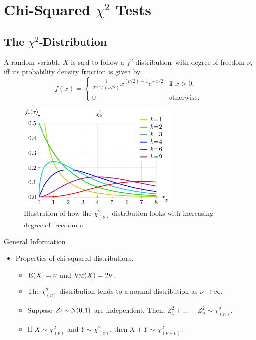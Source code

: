 \documentclass[../Notes.tex]{subfiles}
\begin{document}
\chapter{Chi-Squared \(\chi^2\) Tests}
\section{The \(\chi^2\)-Distribution}
\begin{definition}{}{}
  A random variable \(X\) is said to follow a \(\chi^2\)-distribution, with degree of freedom \(\nu\), iff its probability density function is given by
  \[f(x)=\begin{cases}
    \frac{1}{2^{\nu/2}\Gamma(\nu/2)}x^{(\nu/2)-1}e^{-x/2} &\text{if \(x>0\)},\\
    0 &\text{otherwise}.
  \end{cases}\]
\end{definition}
\begin{figure}[H]
  \centering
  \includegraphics[width=0.7\textwidth]{../Diagrams/Chi-square.pdf}
  \caption{Illustration of how the \(\chi_{(\nu)}^2\) distribution looks with increasing degree of freedom \(\nu\).}
  \label{fig:chi-square}
\end{figure}
\begin{stbox}{General Information}
  \begin{itemize}
    \item Properties of chi-squared distributions.
    \begin{itemize}
      \item \(\operatorname{E}(X)=\nu\) and \(\operatorname{Var}(X)=2\nu\).
      \item The \(\chi_{(\nu)}^2\) distribution tends to a normal distribution as \(\nu\to\infty\).
      \item Suppose \(Z_i\sim\operatorname{N}(0,1)\) are independent. Then, \(Z_1^2+\dots+Z_n^2\sim\chi^2_{(n)}\).
      \item If \(X\sim\chi_{(\nu)}^2\) and \(Y\sim\chi_{(\upsilon)}^2\), then \(X+Y\sim\chi_{(\nu+\upsilon)}^2\).
    \end{itemize}
  \end{itemize}
\end{stbox}
\end{document}
